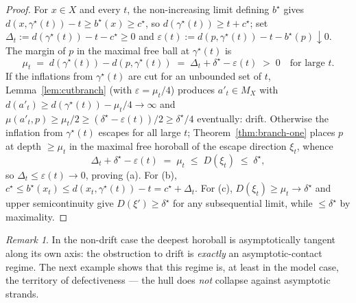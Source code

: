 \documentclass[11pt]{article}
\theoremstyle{remark}
\newtheorem{remark}[theorem]{Remark}
\newcommand{\X}{X}
\newcommand{\Mx}{M_{\X}}
\begin{document}
\begin{proof}
For $x\in\X$ and every $t$, the non-increasing limit defining
$b^{\star}$ gives $d(x,\gamma^{\star}(t))-t\ge b^{\star}(x)\ge
c^{\star}$, so $d(\gamma^{\star}(t))\ge t+c^{\star}$; set
$\Delta_{t}:=d(\gamma^{\star}(t))-t-c^{\star}\ge0$ and
$\varepsilon(t):=d(p,\gamma^{\star}(t))-t-b^{\star}(p)\downarrow0$.
The margin of $p$ in the maximal free ball at $\gamma^{\star}(t)$ is
\[
\mu_{t}\;=\;d(\gamma^{\star}(t))-d(p,\gamma^{\star}(t))
\;=\;\Delta_{t}+\delta^{\star}-\varepsilon(t)\;>\;0
\quad\text{for large } t .
\]
If the inflations from $\gamma^{\star}(t)$ are cut for an unbounded
set of $t$, Lemma~\ref{lem:cutbranch} (with
$\varepsilon=\mu_{t}/4$) produces $a'_{t}\in\Mx$ with
$d(a'_{t})\ge d(\gamma^{\star}(t))-\mu_{t}/4\to\infty$ and
$\mu(a'_{t},p)\ge\mu_{t}/2\ge(\delta^{\star}-\varepsilon(t))/2\ge
\delta^{\star}/4$ eventually: drift. Otherwise the inflation from
$\gamma^{\star}(t)$ escapes for all large $t$;
Theorem~\ref{thm:branch-one} places $p$ at depth $\ge\mu_{t}$ in the
maximal free horoball of the escape direction $\xi_{t}$, whence
\[
\Delta_{t}+\delta^{\star}-\varepsilon(t)\;=\;\mu_{t}\;\le\;
D(\xi_{t})\;\le\;\delta^{\star},
\]
so $\Delta_{t}\le\varepsilon(t)\to0$, proving (a). For (b),
$c^{\star}\le b^{\star}(x_{t})\le
d(x_{t},\gamma^{\star}(t))-t=c^{\star}+\Delta_{t}$. For (c),
$D(\xi_{t})\ge\mu_{t}\to\delta^{\star}$ and upper semicontinuity give
$D(\xi')\ge\delta^{\star}$ for any subsequential limit, while
$\le\delta^{\star}$ by maximality.
\end{proof}

\begin{remark}
In the non-drift case the deepest horoball is asymptotically tangent
along its own axis: the obstruction to drift is \emph{exactly} an
asymptotic-contact regime. The next example shows that this regime
is, at least in the model case, the territory of defectiveness ---
the hull does \emph{not} collapse against asymptotic strands.
\end{remark}
\end{document}
